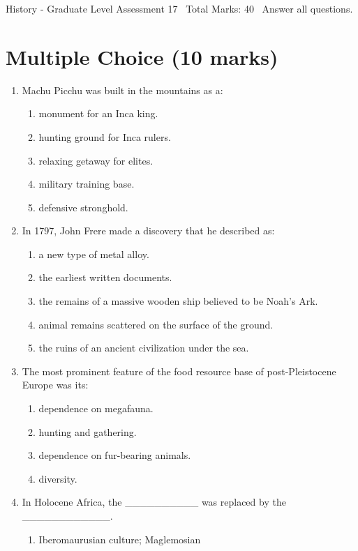 \documentclass[12pt]{article}
\begin{document}
\begin{center}
History - Graduate Level Assessment 17 \
Total Marks: 40 \
Answer all questions.
\end{center}

\section*{Multiple Choice (10 marks)}
\begin{enumerate}[label=\arabic*.]
\item Machu Picchu was built in the mountains as a:
\begin{enumerate}[label=(\alph*)]
    \item monument for an Inca king.
    \item hunting ground for Inca rulers.
    \item relaxing getaway for elites.
    \item military training base.
    \item defensive stronghold.
\end{enumerate}
\item In 1797, John Frere made a discovery that he described as:
\begin{enumerate}[label=(\alph*)]
    \item a new type of metal alloy.
    \item the earliest written documents.
    \item the remains of a massive wooden ship believed to be Noah's Ark.
    \item animal remains scattered on the surface of the ground.
    \item the ruins of an ancient civilization under the sea.
\end{enumerate}
\item The most prominent feature of the food resource base of post-Pleistocene Europe was its:
\begin{enumerate}[label=(\alph*)]
    \item dependence on megafauna.
    \item hunting and gathering.
    \item dependence on fur-bearing animals.
    \item diversity.
\end{enumerate}
\item In Holocene Africa, the \_\_\_\_\_\_\_\_\_\_ was replaced by the \_\_\_\_\_\_\_\_\_\_\_\_.
\begin{enumerate}[label=(\alph*)]
    \item Iberomaurusian culture; Maglemosian

\end{enumerate}
\end{enumerate}
\end{document}
